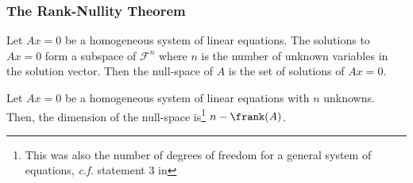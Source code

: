 \subsubsection{The Rank-Nullity Theorem}\label{subsubsec-rank-nullity-theorem}

\begin{definition}\label{def-null-space}
	Let $Ax=0$ be a homogeneous system of linear equations. The solutions to $Ax=0$
	form a subspace of $\mathcal{F}^n$ where $n$ is the number of unknown variables
	in the solution vector. Then the null-space of $A$ is the set of solutions of
	$Ax=0$.
\end{definition}

\begin{thm}\label{thm-dim-null-space}
	Let $Ax=0$ be a homogeneous system of linear equations with $n$ unknowns.
	Then, the dimension of the null-space is\footnote{This was also the number
		of degrees of freedom for a general system of equations, \textit{c.f.} statement 3
		in } $n-\frank(A)$.
\end{thm}

